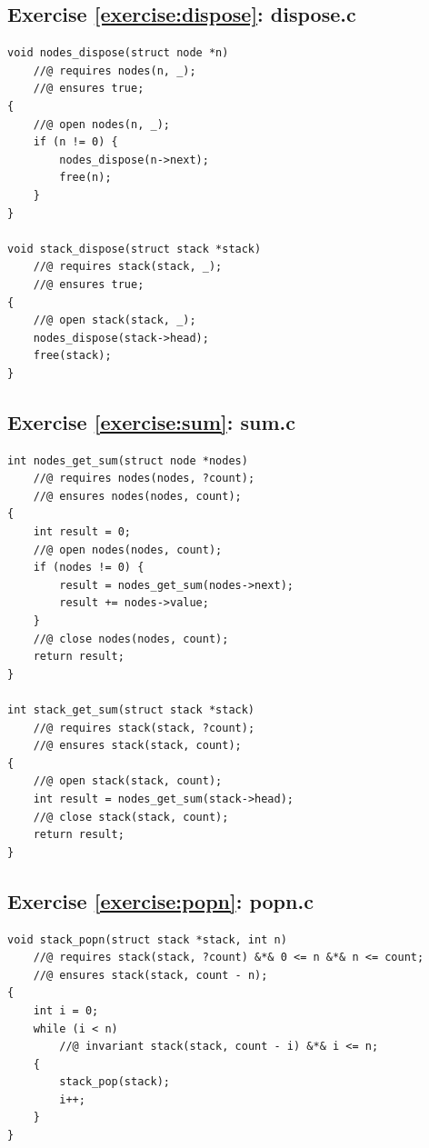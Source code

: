 \documentclass{article}
\begin{document}
\subsection{Exercise
\ref{exercise:dispose}: dispose.c}\label{solution:dispose}

\begin{lstlisting}
void nodes_dispose(struct node *n)
    //@ requires nodes(n, _);
    //@ ensures true;
{
    //@ open nodes(n, _);
    if (n != 0) {
        nodes_dispose(n->next);
        free(n);
    }
}

void stack_dispose(struct stack *stack)
    //@ requires stack(stack, _);
    //@ ensures true;
{
    //@ open stack(stack, _);
    nodes_dispose(stack->head);
    free(stack);
}
\end{lstlisting}

\subsection{Exercise
\ref{exercise:sum}: sum.c}\label{solution:sum}

\begin{lstlisting}
int nodes_get_sum(struct node *nodes)
    //@ requires nodes(nodes, ?count);
    //@ ensures nodes(nodes, count);
{
    int result = 0;
    //@ open nodes(nodes, count);
    if (nodes != 0) {
        result = nodes_get_sum(nodes->next);
        result += nodes->value;
    }
    //@ close nodes(nodes, count);
    return result;
}

int stack_get_sum(struct stack *stack)
    //@ requires stack(stack, ?count);
    //@ ensures stack(stack, count);
{
    //@ open stack(stack, count);
    int result = nodes_get_sum(stack->head);
    //@ close stack(stack, count);
    return result;
}
\end{lstlisting}

\subsection{Exercise
\ref{exercise:popn}: popn.c}\label{solution:popn}

\begin{lstlisting}
void stack_popn(struct stack *stack, int n)
    //@ requires stack(stack, ?count) &*& 0 <= n &*& n <= count;
    //@ ensures stack(stack, count - n);
{
    int i = 0;
    while (i < n)
        //@ invariant stack(stack, count - i) &*& i <= n;
    {
        stack_pop(stack);
        i++;
    }
}
\end{lstlisting}
\end{document}
